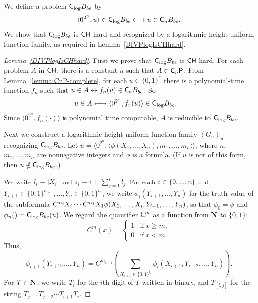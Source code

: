 We define a problem $\mathsf{C}_{\log} B_{be}$ by
\begin{equation}
 \langle 0^{2^n}, u \rangle \in \mathsf{C}_{\log} B_{be}
 \longleftrightarrow
 u \in \mathsf{C}_n B_{be}.
\end{equation}
We show that $\mathsf{C}_{\log} B_{be}$ 
is $\mathsf{CH}$-hard and recognized by a logarithmic-height uniform function family,
as required in Lemma~\ref{DIVPlogIsCHhard}. 

\begin{proof}[Lemma~\ref{DIVPlogIsCHhard}]
First we prove that $\mathsf{C}_{\log} B_{be}$ is $\mathsf{CH}$-hard.
For each problem $A$ in $\mathsf{CH}$, there is a constant $n$ such that $A \in \mathsf{C}_n \mathsf{P}$.
From Lemma~\ref{lemma:CnP-complete}, for each $u \in \{0,1\}^*$
there is a polynomial-time function $f_n$ such that
$u \in A \leftrightarrow f_n(u) \in \mathsf{C}_n B_{be}$. So
\begin{align}
 u \in A 
 & \longleftrightarrow \langle 0^{2^n}, f_n(u) \rangle \in \mathsf{C}_{\log} B_{be}.
\end{align}
Since $\langle 0^{2^n}, f_n(\cdot) \rangle$ is polynomial time computable,
$A$ is reducible to $\mathsf{C}_{\log} B_{be}$.


Next we construct a logarithmic-height uniform function family $(G_u)_u$
recognizing $\mathsf{C}_{\log} B_{be}$.
Let $u  = \langle 0^{2^n}, 
\langle \phi(X_1, \dots, X_n), m_1, \dots, m_n \rangle \rangle$, 
where $n$, $m_1, \dots, m_n$ are nonnegative integers 
and $\phi$ is a formula. 
(If $u$ is not of this form, then $u \notin \mathsf{C}_{\log} B_{be}$.)
 
We write $l_i = |X_i|$ and $s_i = i + \sum^i_{j=1}l_j$.
For each $i \in \{0, \dots, n\}$ and
$Y_{i+1} \in \{0,1\}^{l_{i+1}}, \dots, Y_n \in \{0,1\}^{l_n}$,
we write $\phi_i(Y_{i+1}, \dots, Y_n)$ for the truth value of the subformula
$\mathsf{C}^{m_{i}}{X_i} \cdots \mathsf{C}^{m_1}{X_1} \phi(X_1, \dots, X_i, Y_{i+1}, \dots, Y_n)$,
so that $\phi_0 = \phi$ and $\phi_n() = \mathsf{C}_{\log} B_{be} (u)$.
We regard the quantifier $\mathsf{C}^m$ as a function from $\mathbf N$ to $\{0,1\}$:
\begin{equation}
 C^m(x) 
  = \begin{cases}
     1 & \text{if} \ x \ge m, \\
     0 & \text{if} \ x < m.
    \end{cases}
\end{equation}
Thus,
\begin{equation} \label{eq:phi-step}
 \phi_{i+1}(Y_{i+2}, \dots, Y_n) 
  = C^{m_{i+1}}\left(\sum_{X_{i+1} \in \{ 0,1 \} ^{l_i}}
		\phi_i(X_{i+1}, Y_{i+2}, \dots, Y_{n})\right).
\end{equation}
For $T \in \mathbf N$, we write $T_i$ for the $i$th digit of $T$ written in binary,
and $T_{[i,j]}$ for the string $T_{j-1} T_{j-2} \cdots T_{i+1} T_{i}$.


\end{proof}
